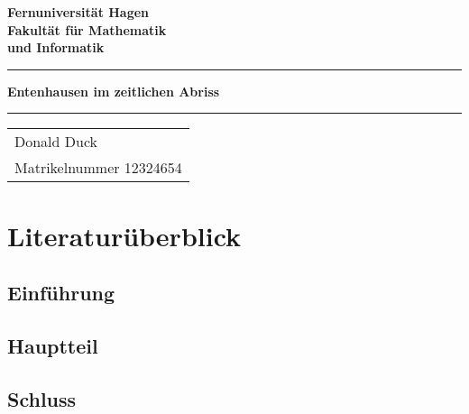 \documentclass[12pt,ngerman,parskip=half]{scrreport}
\begin{document}
\begin{titlepage}
{\Huge\bfseries Fernuniversität Hagen \\ Fakultät für Mathematik \\ und Informatik }

\rule{\textwidth}{1pt}

\vspace*{4cm}
\begin{center}
{\LARGE\bfseries Entenhausen im zeitlichen Abriss}
\end{center}

\vspace*{3cm}
\begin{center}
\rule{5cm}{5cm}
\end{center}


\vfill
{\Large
\begin{tabular}{l}
Donald Duck \\
Matrikelnummer 12324654 \\
\end{tabular}}

\end{titlepage}


\tableofcontents

\chapter{Literaturüberblick}
\section{Einführung}

\blindtext

\section{Hauptteil}

\blindtext

\section{Schluss}

\blindtext
\end{document}
